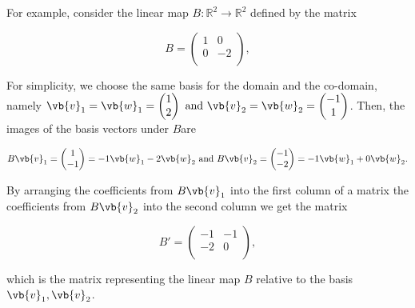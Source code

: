 \documentclass[a4paper,12pt]{report}
\begin{document}
\example{}
{}
{For example, consider the linear map \(B: \mathbb{R}^2 \rightarrow \mathbb{R}^2\) defined by the matrix

\begin{equation}
    B = \begin{pmatrix}
        1 &  0 \\
        0 &  -2 \\
    \end{pmatrix},
\end{equation}  

For simplicity, we choose the same basis for the domain and the co-domain, namely \(\vb{v} _{1} = \vb{w} _{1} = \begin{pmatrix}
     1 \\
     2 \\
\end{pmatrix} \text { and } \vb{v} _{2} = \vb{w} _{2} = \begin{pmatrix}
     -1 \\
     1 \\
\end{pmatrix}    \). Then, the images of the basis vectors under \(B\)are

\begin{equation}
    B\vb{v} _{1} = \begin{pmatrix}
         1 \\
         -1 \\
    \end{pmatrix} = -1\vb{w} _{1}  - 2 \vb{w} _{2} \text { and } B\vb{v} _{2} = \begin{pmatrix}
         -1 \\
         -2 \\
    \end{pmatrix} = -1\vb{w} _{1} +0\vb{w} _{2} . 
\end{equation}

By arranging the coefficients from \(B\vb{v} _{1} \) into the first column of a matrix the coefficients from \(B\vb{v} _{2} \) into the second column we get the matrix  

\begin{equation}
    B' = \begin{pmatrix}
        -1 &  -1 \\
        -2 &  0 \\
    \end{pmatrix},
\end{equation}

which is the matrix representing the linear map \(B\) relative to the basis \({\vb{v} _{1} ,\vb{v} _{2} }\).   

}
\end{document}
